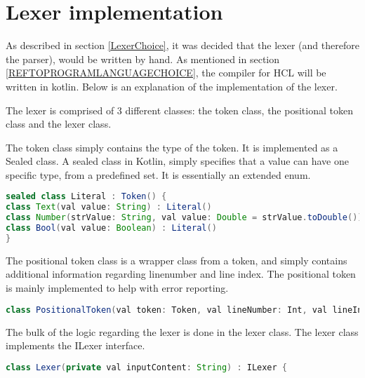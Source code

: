 \section{Lexer implementation}
As described in section \ref{LexerChoice}, it was decided that the lexer (and therefore the parser), would be written by hand.
As mentioned in section \ref{REFTOPROGRAMLANGUAGECHOICE}, the compiler for HCL will be written in kotlin.
Below is an explanation of the implementation of the lexer.

The lexer is comprised of 3 different classes: the token class, the positional token class and the lexer class.

The token class simply contains the type of the token. 
It is implemented as a Sealed class. 
A sealed class in Kotlin, simply specifies that a value can have one specific type, from a predefined set\cite{KotlinSealed}.
It is essentially an extended enum.
\begin{lstlisting}[language=java,label=lis:tokenClass,caption=A snippet from the token class .,firstnumber=9]
sealed class Literal : Token() {
class Text(val value: String) : Literal()
class Number(strValue: String, val value: Double = strValue.toDouble()) : Literal()
class Bool(val value: Boolean) : Literal()
}
\end{lstlisting}

The positional token class is a wrapper class from a token, and simply contains additional information regarding linenumber and line index.
The positional token is mainly implemented to help with error reporting.
\begin{lstlisting}[language=java,label=lis:PositionalTokenClass,caption=A snippet from the token class .,firstnumber=10]
class PositionalToken(val token: Token, val lineNumber: Int, val lineIndex: Int)
\end{lstlisting}

The bulk of the logic regarding the lexer is done in the lexer class.
The lexer class implements the ILexer interface.

\begin{lstlisting}[language=java,label=lis:Lexer,caption=The Lexer .,firstnumber=8]
class Lexer(private val inputContent: String) : ILexer {
\end{lstlisting}

